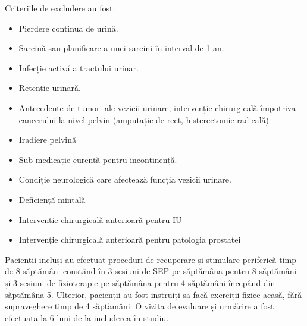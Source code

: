 \documentclass[12pt]{article}
\begin{document}
 Criteriile de excludere au fost:
  \begin{itemize}
    \item Pierdere continuă de urină.
    \item Sarcină sau planificare a unei sarcini în interval de 1 an.
    \item Infecție activă a tractului urinar.
    \item Retenție urinară.
    \item Antecedente de tumori ale vezicii urinare, intervenție chirurgicală împotriva cancerului la nivel pelvin (amputație de rect, histerectomie radicală)
    \item Iradiere pelvină
    \item Sub medicație curentă pentru incontinență.
    \item Condiție neurologică care afectează funcția vezicii urinare.
    \item Deficiență mintală 
    \item Intervenție chirurgicală anterioară pentru IU
    \item Intervenție chirurgicală anterioară pentru patologia prostatei 
   \end{itemize}
  Pacienții incluși au efectuat proceduri de recuperare și stimulare periferică timp de 8 săptămâni constând în 3 sesiuni de \ac{SEP} pe săptămâna pentru 8 săptămâni și 3 sesiuni de fizioterapie pe săptămâna pentru 4 săptămâni începând din săptămâna 5. Ulterior, pacienții au fost instruiți sa facă exerciții fizice acasă, fără supraveghere timp de 4 săptămâni. O vizita de evaluare și urmărire a fost efectuata la 6 luni de la includerea în studiu.
  
\end{document}
